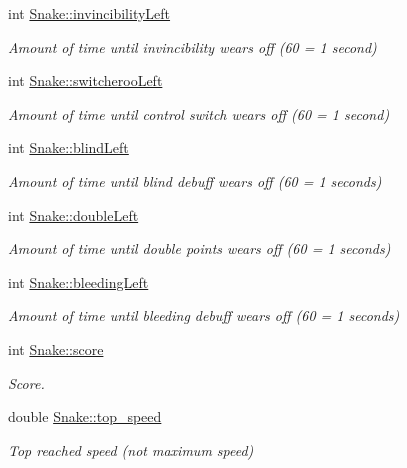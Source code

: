 \begin{DoxyCompactItemize}
int \mbox{\hyperlink{group__snake_gae942bd8af663886b8e1c4274062174b5}{Snake\+::invincibility\+Left}}
\begin{DoxyCompactList}\small\item\em Amount of time until invincibility wears off (60 = 1 second) \end{DoxyCompactList}\item 
int \mbox{\hyperlink{group__snake_ga66233a102458e305c73cbfdb6d40100f}{Snake\+::switcheroo\+Left}}
\begin{DoxyCompactList}\small\item\em Amount of time until control switch wears off (60 = 1 second) \end{DoxyCompactList}\item 
int \mbox{\hyperlink{group__snake_gadc0bae4f8aea84e975419c3186008be3}{Snake\+::blind\+Left}}
\begin{DoxyCompactList}\small\item\em Amount of time until blind debuff wears off (60 = 1 seconds) \end{DoxyCompactList}\item 
int \mbox{\hyperlink{group__snake_gadc6fa6383ebace6fbeb2e6a2ebcbb04a}{Snake\+::double\+Left}}
\begin{DoxyCompactList}\small\item\em Amount of time until double points wears off (60 = 1 seconds) \end{DoxyCompactList}\item 
int \mbox{\hyperlink{group__snake_ga7b1c76ccd41a023734f3fe689279bace}{Snake\+::bleeding\+Left}}
\begin{DoxyCompactList}\small\item\em Amount of time until bleeding debuff wears off (60 = 1 seconds) \end{DoxyCompactList}\item 
int \mbox{\hyperlink{group__snake_gae5b13aadb0092ce8c45e04de9024444f}{Snake\+::score}}
\begin{DoxyCompactList}\small\item\em Score. \end{DoxyCompactList}\item 
double \mbox{\hyperlink{group__snake_ga26df95d629329c163a1153f81e1c8b17}{Snake\+::top\+\_\+speed}}
\begin{DoxyCompactList}\small\item\em Top reached speed (not maximum speed) \end{DoxyCompactList}\item 

\end{DoxyCompactItemize}
